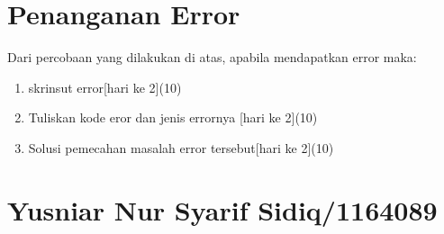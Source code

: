 \section{Penanganan Error}
Dari percobaan yang dilakukan di atas, apabila mendapatkan error maka:

\begin{enumerate}
	\item
	skrinsut error[hari ke 2](10)
	\item
Tuliskan kode eror dan jenis errornya [hari ke 2](10)
	\item
Solusi pemecahan masalah error tersebut[hari ke 2](10)

\end{enumerate}

\section{Yusniar Nur Syarif Sidiq/1164089}
